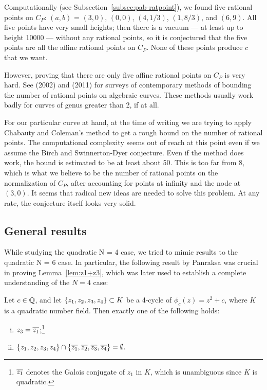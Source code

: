 Computationally (see Subsection~\ref{subsec:pab-ratpoint}), we found
five rational points on $C_P$: $(a, b)$ = $(3, 0)$, $(0, 0)$, $(4,
1/3)$, $(1, 8/3)$, and $(6, 9)$. All five points have very small
heights; then there is a vacuum --- at least up to height 10000 ---
without any rational points, so it is conjectured that the five points
are all the affine rational points on $C_P$. None of these points
produce $c$ that we want.

However, proving that there are only five affine rational points on
$C_P$ is very hard. See \cite{MR1956273} (2002) and \cite{MR2780629}
(2011) for surveys of contemporary methods of bounding the number of
rational points on algebraic curves. These methods usually work badly
for curves of genus greater than 2, if at all.

For our particular curve at hand, at the time of writing we are trying
to apply Chabauty and Coleman's method to get a rough bound on the
number of rational points. The computational complexity seems out of
reach at this point even if we assume the Birch and Swinnerton-Dyer
conjecture. Even if the method does work, the bound is estimated to be
at least about 50. This is too far from 8,
which is what we believe to be the number of rational points on the
normalization of $C_P$, after accounting for points at infinity and
the node at $(3, 0)$. It seems that radical new ideas are needed to
solve this problem. At any rate, the conjecture itself looks very
solid.

\subsection{General results}
\label{subsec:general}

While studying the quadratic N = 4 case, we tried to mimic results
to the quadratic N = 6 case. In particular, the following result by
Panraksa was crucial in proving Lemma~\ref{lem:z1+z3}, which was later
used to establish a complete understanding of the $N = 4$ case:

\begin{theorem} 
  Let $c \in \mathbb{Q}$, and let $\left\{z_1, z_2, z_3, z_4\right\} \subset K$ be a
  4-cycle of $\phi_c(z) = z^2 + c$, where $K$ is a quadratic number
  field. Then exactly one of the following holds:
  \begin{enumerate}[(i)]
  \item $z_3 = \overline{z_1}$;\footnote{%
      $\overline{z_1}$ denotes the Galois conjugate of $z_1$ in $K$, which
      is unambiguous since $K$ is quadratic.}

  \item $\{z_1, z_2, z_3, z_4\} \cap \{\overline{z_1}, \overline{z_2}, \overline{z_3},
    \overline{z_4}\} =\emptyset.$
  \end{enumerate}
\end{theorem}

